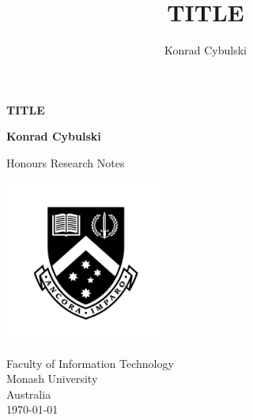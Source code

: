 \documentclass[10pt,a4paper]{article}
\author{Konrad Cybulski}
\title{TITLE}
\begin{document}
	
\begin{titlepage}
	\begin{center}
		\vspace*{1cm}
		
		\LARGE
		\textbf{TITLE}
		
		\vspace{2cm}
		\Large
		
		\textbf{Konrad Cybulski}
		
		\vfill
		
		Honours Research Notes
		
		\vspace{0.8cm}
		
		\includegraphics[width=0.4\textwidth]{images/monash_emblem.jpg}
		
		\large
		Faculty of Information Technology\\
		Monash University\\
		Australia\\
		\today
		
	\end{center}
\end{titlepage}

\pagebreak
\tableofcontents
\pagebreak
\end{document}
